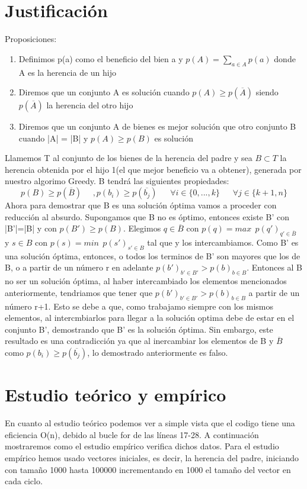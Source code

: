 \documentclass[11pt,openany]{book}
\begin{document}
\section{Justificación}
Proposiciones:
\begin{enumerate}
      \item Definimos p(a) como el beneficio del bien a y $p(A)=\sum_{a \in A} p(a) $
      donde A es la herencia de un hijo
      \item Diremos que un conjunto A es solución cuando $p(A) \geq p(\overline{A})$ 
      siendo $p(\overline{A})$ la herencia del otro hijo 
      \item Diremos que un conjunto A de bienes es mejor solución que otro conjunto B cuando
      |A| = |B| y $p(A) \geq p(B)$ es solución
\end{enumerate}
Llamemos T al conjunto de los bienes de la herencia del padre y sea $B \subset T$ la herencia obtenida por el hijo
1(el que mejor beneficio va a obtener), generada por nuestro algorimo Greedy. B tendrá las 
siguientes propiedades:
\begin{equation*}
      p(B) \geq p(\overline{B}) \ \  \ \ \ \ , p(b_i) \geq p(\overline{b_j})  \  \ \ \ \ \ \ \forall i \in \{0,...,k\} \ \ \ \ \ \ \  \forall j \in \{k+1,n\}
\end{equation*}
Ahora para demostrar que B es una solución óptima vamos a proceder con reducción al absurdo.
Supongamos que B no es óptimo, entonces existe B' con |B'|=|B| y con $p(B') \geq p(B)$.
Elegimos $q \in \overline{B}$ con $ p(q) = max\ \ p(q')_{q' \in \overline{B}} $ 
y $s \in B$ con $ p(s) = min\ \ p(s')_{s' \in B } $ tal que  y los intercambiamos. Como B' es
una solución óptima, entonces, o todos los terminos de B' son mayores que los de B, o a partir de un 
número r en adelante $p(b')_{b'\in B'} > p(b)_{b \in B}$. Entonces al B no ser un solución óptima, al
haber intercambiado los elementos mencionados anteriormente, tendriamos que tener que $p(b')_{b'\in B'} > p(b)_{b \in B}$
a partir de un número r+1. Esto se debe a que, como trabajamo siempre con los mismos elementos,
al intercmbiarlos para llegar a la solución optima debe de estar en el conjunto B', demostrando que
B' es la solución óptima. Sin embargo, este resultado es una contradicción ya que al inercambiar los 
elementos de B y $\overline{B}$ como $p(b_i) \geq p(\overline{b_j})$, lo demostrado anteriormente es falso.
\section{Estudio teórico y empírico}
En cuanto al estudio teórico podemos ver a simple vista que el codigo tiene una eficiencia O(n), debido al bucle
for de las líneas 17-28. A continuación mostraremos como el estudio empírico verifica dichos datos. Para el estudio 
empírico hemos usado vectores iniciales, es decir, la herencia del padre, iniciando con tamaño 1000 hasta 100000 
incrementando en 1000 el tamaño del vector en cada ciclo.
\end{document}

